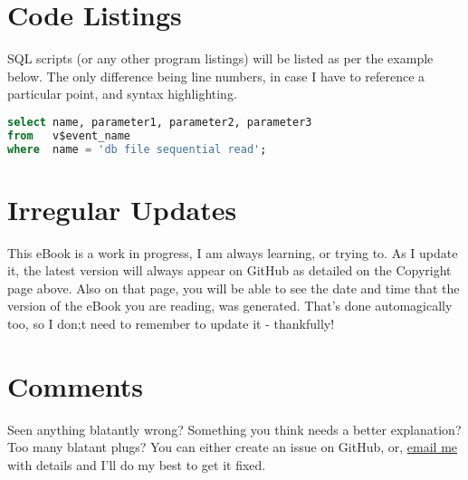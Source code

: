 \section*{Code Listings}

SQL scripts (or any other program listings) will be listed as per the example below. The only difference being line numbers, in case I have to reference a particular point, and syntax highlighting.

\begin{lstlisting}[language=SQL]
select name, parameter1, parameter2, parameter3
from   v$event_name
where  name = 'db file sequential read';
\end{lstlisting}

\section*{Irregular Updates}

This eBook is a work in progress, I am always learning, or trying to. As I update it, the latest version will always appear on GitHub as detailed on the Copyright page above. Also on that page, you will be able to see the date and time that the version of the eBook you are reading, was generated. That's done automagically too, so I don;t need to remember to update it - thankfully!

\section*{Comments}

Seen anything blatantly wrong? Something  you think needs a better explanation? Too many blatant plugs? You can either create an issue on GitHub, or, \href{mailto://norman@dunbar-it.co.uk}{email me} with details and I'll do my best to get it fixed.